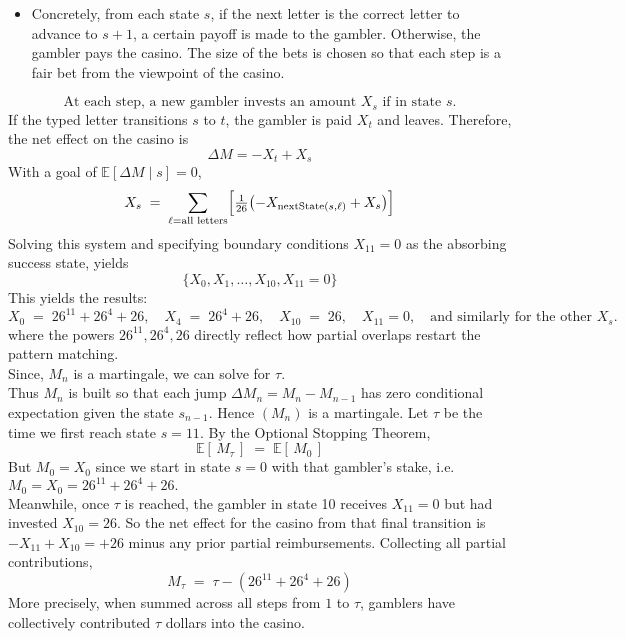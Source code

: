 \documentclass{article}
\begin{document}
\begin{enumerate}
{\begin{itemize}
  \[
  \mathbb{E}[\Delta M_n \mid \text{previous info}] = 0
  \]
\item Concretely, from each state $s$, if the next letter is the correct letter to advance to $s+1$, a certain payoff is made to the gambler. Otherwise, the gambler pays the casino. The size of the bets is chosen so that each step is a fair bet from the viewpoint of the casino.  \\
\end{itemize}
\[
\text{At each step, a new gambler invests an amount }X_{s}\text{ if in state }s.
\]
If the typed letter transitions $s$ to $t$, the gambler is paid $X_{t}$ and leaves. Therefore, the net effect on the casino is
\[
\Delta M = - X_{t} + X_{s}
\]
With a goal of 
\(\mathbb{E}[\Delta M \mid s] = 0\),
\[
X_{s} \;=\; \sum_{\ell= \text{all letters}} \Bigl[\tfrac{1}{26} \bigl(-X_{\text{nextState}(s,\ell)} + X_s\bigr)\Bigr]
\]
Solving this system and specifying boundary conditions $X_{11}=0$ as the absorbing success state, yields
\[
\{X_0, X_1,\dots, X_{10}, X_{11}=0\}
\]
This yields the results:
\[
X_0 \;=\; 26^{11} + 26^{4} + 26,
\quad
X_4 \;=\; 26^4 + 26,
\quad
X_{10} \;=\; 26,
\quad
X_{11}=0,
\quad
\text{and similarly for the other }X_s.
\]
where the powers $26^{11}, 26^4, 26$ directly reflect how partial overlaps restart the pattern matching. \\
\bigskip
Since, $M_n$ is a martingale, we can solve for $\tau$. \\
Thus $M_n$ is built so that each jump 
\(\Delta M_n = M_n - M_{n-1}\) 
has zero conditional expectation given the state $s_{n-1}$. Hence $(M_n)$ is a martingale. Let $\tau$ be the time we first reach state $s=11$. By the Optional Stopping Theorem,
\[
\mathbb{E}[\,M_{\tau}\,] 
\;=\; \mathbb{E}[\,M_0\,]
\]
But $M_0 = X_0$ since we start in state $s=0$ with that gambler's stake, i.e.\ $M_0 = X_0 = 26^{11} + 26^4 + 26.$ \\
Meanwhile, once $\tau$ is reached, the gambler in state 10 receives $X_{11}=0$ but had invested $X_{10}=26$. So the net effect for the casino from that final transition is $-X_{11}+X_{10}=+26$ minus any prior partial reimbursements. Collecting all partial contributions,
\[
M_{\tau} \;=\; \tau - (26^{11} + 26^4 + 26)
\]
More precisely, when summed across all steps from $1$ to $\tau$, gamblers have collectively contributed $\tau$ dollars into the casino. 
}
\end{enumerate}
\end{document}
